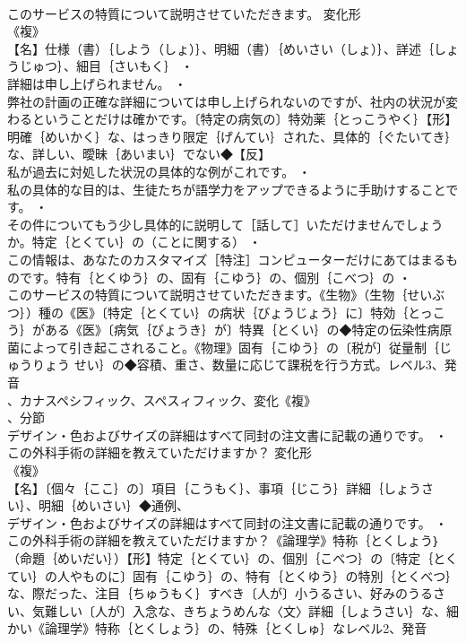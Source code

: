 \documentclass[8pt]{extreport}
\begin{document}
\begin{CJK}{UTF8}{min}
\\	このサービスの特質について説明させていただきます。	変化形 
\\	《複》
\\	【名】仕様（書）｛しよう（しょ）｝、明細（書）｛めいさい（しょ）｝、詳述｛しょうじゅつ｝、細目｛さいもく｝ ・
\\	詳細は申し上げられません。 ・
\\	弊社の計画の正確な詳細については申し上げられないのですが、社内の状況が変わるということだけは確かです。〔特定の病気の〕特効薬｛とっこうやく｝【形】明確｛めいかく｝な、はっきり限定｛げんてい｝された、具体的｛ぐたいてき｝な、詳しい、曖昧｛あいまい｝でない◆【反】
\\	私が過去に対処した状況の具体的な例がこれです。 ・
\\	私の具体的な目的は、生徒たちが語学力をアップできるように手助けすることです。 ・
\\	その件についてもう少し具体的に説明して［話して］いただけませんでしょうか。特定｛とくてい｝の（ことに関する） ・
\\	この情報は、あなたのカスタマイズ［特注］コンピューターだけにあてはまるものです。特有｛とくゆう｝の、固有｛こゆう｝の、個別｛こべつ｝の ・
\\	このサービスの特質について説明させていただきます。《生物》（生物｛せいぶつ｝）種の《医》〔特定｛とくてい｝の病状｛びょうじょう｝に〕特効｛とっこう｝がある《医》〔病気｛びょうき｝が〕特異｛とくい｝の◆特定の伝染性病原菌によって引き起こされること。《物理》固有｛こゆう｝の〔税が〕従量制｛じゅうりょう せい｝の◆容積、重さ、数量に応じて課税を行う方式。レベル3、発音
\\	、カナスペシフィック、スペスィフィック、変化《複》
\\	、分節
\\	デザイン・色およびサイズの詳細はすべて同封の注文書に記載の通りです。 ・
\\	この外科手術の詳細を教えていただけますか？	変化形 
\\	《複》
\\	【名】〔個々｛ここ｝の〕項目｛こうもく｝、事項｛じこう｝詳細｛しょうさい｝、明細｛めいさい｝◆通例、
\\	デザイン・色およびサイズの詳細はすべて同封の注文書に記載の通りです。 ・
\\	この外科手術の詳細を教えていただけますか？《論理学》特称｛とくしょう｝（命題｛めいだい｝）【形】特定｛とくてい｝の、個別｛こべつ｝の〔特定｛とくてい｝の人やものに〕固有｛こゆう｝の、特有｛とくゆう｝の特別｛とくべつ｝な、際だった、注目｛ちゅうもく｝すべき〔人が〕小うるさい、好みのうるさい、気難しい〔人が〕入念な、きちょうめんな〈文〉詳細｛しょうさい｝な、細かい《論理学》特称｛とくしょう｝の、特殊｛とくしゅ｝なレベル2、発音

\end{CJK}
\end{document}
